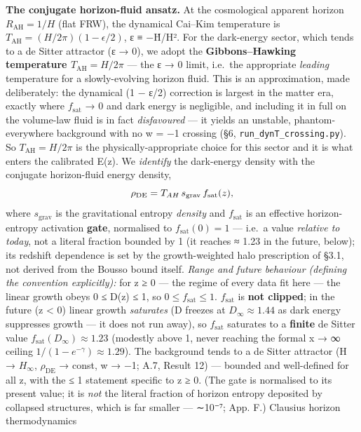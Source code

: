 \documentclass[
  10pt,
]{article}
\begin{document}
\textbf{The conjugate horizon-fluid ansatz.} At the cosmological
apparent horizon \(R_{\mathrm{AH}} = 1/H\) (flat FRW), the dynamical
Cai--Kim temperature is
\(T_{\mathrm{AH}} = (H/2\pi )(1 - \epsilon /2)\), ε ≡ −Ḣ/H². For the
dark-energy sector, which tends to a de Sitter attractor (ε → 0), we
adopt the \textbf{Gibbons--Hawking temperature
\(T_{\mathrm{AH}} = H/2\pi\)} --- the ε → 0 limit, i.e.~the appropriate
\emph{leading} temperature for a slowly-evolving horizon fluid. This is
an approximation, made deliberately: the dynamical (1 − ε/2) correction
is largest in the matter era, exactly where \(f_{\mathrm{sat}}\) → 0 and
dark energy is negligible, and including it in full on the volume-law
fluid is in fact \emph{disfavoured} --- it yields an unstable,
phantom-everywhere background with no w = −1 crossing (§6,
\texttt{run\_dynT\_crossing.py}). So \(T_{\mathrm{AH}} = H/2\pi\) is the
physically-appropriate choice for this sector and it is what enters the
calibrated E(z). We \emph{identify} the dark-energy density with the
conjugate horizon-fluid energy density,
\[\rho_{\rm DE} = T_{AH}\, s_{\rm grav}\, f_{\rm sat}(z),\] where
\(s_{\mathrm{grav}}\) is the gravitational entropy \emph{density} and
\(f_{\mathrm{sat}}\) is an effective horizon-entropy activation
\textbf{gate}, normalised to \(f_{\mathrm{sat}}(0) = 1\) --- i.e.~a
value \emph{relative to today}, not a literal fraction bounded by 1 (it
reaches ≈ 1.23 in the future, below); its redshift dependence is set by
the growth-weighted halo prescription of §3.1, not derived from the
Bousso bound itself. \emph{Range and future behaviour (defining the
convention explicitly):} for z ≥ 0 --- the regime of every data fit here
--- the linear growth obeys 0 ≤ D(z) ≤ 1, so
\(0 \leq  f_{\mathrm{sat}} \leq  1\). \(f_{\mathrm{sat}}\) is
\textbf{not clipped}; in the future (z \textless{} 0) linear growth
\emph{saturates} (D freezes at \(D_\infty  \approx  1.44\) as dark
energy suppresses growth --- it does not run away), so
\(f_{\mathrm{sat}}\) saturates to a \textbf{finite} de Sitter value
\(f_{\mathrm{sat}}(D_\infty ) \approx  1.23\) (modestly above 1, never
reaching the formal x → ∞ ceiling \(1/(1-e^{-\gamma }) \approx  1.29\)).
The background tends to a de Sitter attractor (H → \(H_\infty\),
\(\rho _{\mathrm{DE}}\) → const, w → −1; A.7, Result 12) --- bounded and
well-defined for all z, with the ≤ 1 statement specific to z ≥ 0. (The
gate is normalised to its present value; it is \emph{not} the literal
fraction of horizon entropy deposited by collapsed structures, which is
far smaller --- ∼10⁻⁷; App. F.) Clausius horizon thermodynamics
\end{document}
